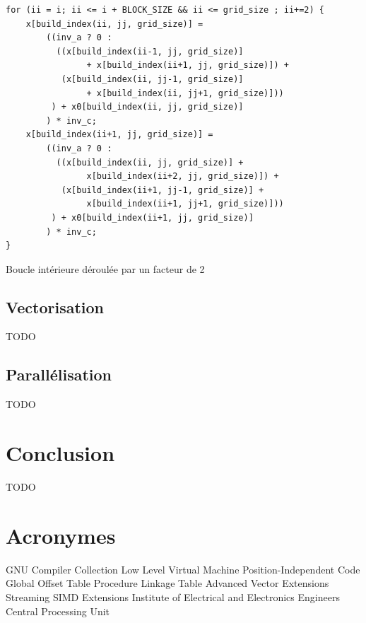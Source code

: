 \documentclass[12pt,a4paper]{article}
\begin{document}
\begin{listing}
    \begin{verbatim}
for (ii = i; ii <= i + BLOCK_SIZE && ii <= grid_size ; ii+=2) {
    x[build_index(ii, jj, grid_size)] = 
        ((inv_a ? 0 :
          ((x[build_index(ii-1, jj, grid_size)]
                + x[build_index(ii+1, jj, grid_size)]) +
           (x[build_index(ii, jj-1, grid_size)]
                + x[build_index(ii, jj+1, grid_size)]))
         ) + x0[build_index(ii, jj, grid_size)]
        ) * inv_c;
    x[build_index(ii+1, jj, grid_size)] = 
        ((inv_a ? 0 :
          ((x[build_index(ii, jj, grid_size)] + 
                x[build_index(ii+2, jj, grid_size)]) +
           (x[build_index(ii+1, jj-1, grid_size)] +
                x[build_index(ii+1, jj+1, grid_size)]))
         ) + x0[build_index(ii+1, jj, grid_size)]
        ) * inv_c;
}
    \end{verbatim}
    \caption{Boucle intérieure déroulée par un facteur de 2}
    \label{lst.optim.unrol}
\end{listing}

\subsection{Vectorisation}
\label{sub.optim.vec}

TODO

\subsection{Parallélisation}
\label{sub.optim.parall}

TODO

\section{Conclusion}
\label{sec.conc}

TODO

\newpage
\section*{Acronymes}
\label{sec.acro}

\begin{acronym}
      {GNU Compiler Collection}
     {Low Level Virtual Machine}
      {Position-Independent Code}
      {Global Offset Table}
      {Procedure Linkage Table}
      {Advanced Vector Extensions}
      {Streaming SIMD Extensions}
     {Institute of Electrical and Electronics Engineers}
      {Central Processing Unit}
\end{acronym}
\end{document}
